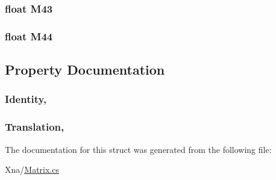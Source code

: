 \subsubsection[{M43}]{\setlength{\rightskip}{0pt plus 5cm}float M43}\label{structMicrosoft_1_1Xna_1_1Framework_1_1Matrix_a915c2cdb3fab4c1d4ec29c30d305057e}
\hypertarget{structMicrosoft_1_1Xna_1_1Framework_1_1Matrix_af0b449cfecbcf03663c74a3a37358e19}{}
\subsubsection[{M44}]{\setlength{\rightskip}{0pt plus 5cm}float M44}\label{structMicrosoft_1_1Xna_1_1Framework_1_1Matrix_af0b449cfecbcf03663c74a3a37358e19}


\subsection{Property Documentation}
\hypertarget{structMicrosoft_1_1Xna_1_1Framework_1_1Matrix_aaec3443624f203ba8453df980d887f8d}{}
\subsubsection[{Identity}]{ Identity\hspace{0.3cm}{\ttfamily [static]}, {\ttfamily [get]}}\label{structMicrosoft_1_1Xna_1_1Framework_1_1Matrix_aaec3443624f203ba8453df980d887f8d}
\hypertarget{structMicrosoft_1_1Xna_1_1Framework_1_1Matrix_a64f890338815f42f9362812e69a2fbb0}{}
\subsubsection[{Translation}]{ Translation\hspace{0.3cm}{\ttfamily [get]}, {\ttfamily [set]}}\label{structMicrosoft_1_1Xna_1_1Framework_1_1Matrix_a64f890338815f42f9362812e69a2fbb0}


The documentation for this struct was generated from the following file\+:\begin{DoxyCompactItemize}
\item 
Xna/\hyperlink{Matrix_8cs}{Matrix.\+cs}\end{DoxyCompactItemize}
